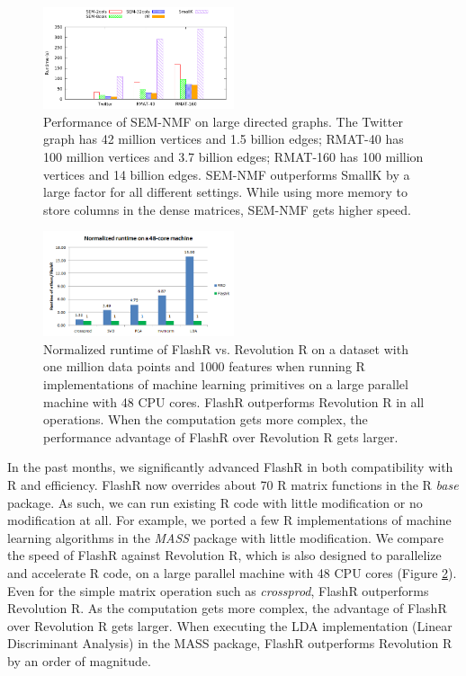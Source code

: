 \documentclass[simplex.tex]{subfiles}
\begin{document}
\begin{figure}[h!]
\begin{cframed}
\centering
\includegraphics[width=0.5\textwidth]{../../figs/nmf.png}
\caption{
Performance of SEM-NMF on large directed graphs. The Twitter graph has
42 million vertices and 1.5 billion edges; RMAT-40 has 100 million vertices
and 3.7 billion edges; RMAT-160 has 100 million vertices and 14 billion
edges. SEM-NMF outperforms SmallK by a large factor for all different settings.
While using more memory to store columns in the dense matrices, SEM-NMF
gets higher speed.
}
\label{fig:nmf}
\end{cframed}
\end{figure}

\begin{figure}[h!]
\begin{cframed}
\centering
\includegraphics[width=0.5\textwidth]{../../figs/FlashR.vs.RRO.png}
\caption{
Normalized runtime of FlashR vs. Revolution R on a dataset with one million
data points and 1000 features when running R implementations of machine
learning primitives on a large parallel machine with
48 CPU cores. FlashR outperforms Revolution R in all operations. When
the computation gets more complex, the performance advantage of FlashR
over Revolution R gets larger.
}
\label{fig:flashr}
\end{cframed}
\end{figure}

In the past months, we significantly advanced FlashR in both compatibility with R
and efficiency. FlashR now overrides about 70 R matrix functions in the R
\textit{base} package. As such, we can run existing R code with little
modification or no modification at all. For example, we ported a few R
implementations of machine learning algorithms in the \textit{MASS} package
with little modification. We compare the speed of FlashR against Revolution R,
which is also designed to parallelize and accelerate R code, on a large parallel
machine with 48 CPU cores (Figure \ref{fig:flashr}).
Even for the simple matrix operation such as \textit{crossprod}, FlashR
outperforms Revolution R. As the computation gets more complex, the advantage
of FlashR over Revolution R gets larger. When executing the LDA implementation
(Linear Discriminant Analysis) in the MASS package, FlashR outperforms Revolution R
by an order of magnitude.
\end{document}
